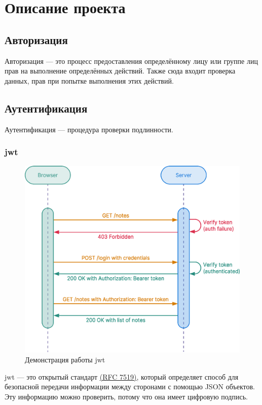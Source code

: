 \section{Описание проекта}
\subsection{Авторизация}
Авторизация --- это процесс предоставления определённому лицу или группе лиц прав на выполнение определённых действий. Также сюда входит проверка данных, прав при попытке выполнения этих действий.

\subsection{Аутентификация}
Аутентификация --- процедура проверки подлинности.

\subsubsection{\acrfull{jwt}}
\begin{figure}[h!]
    \begin{center}
        \includegraphics[scale=0.4]{images/jwt-example.eps}
        \caption{Демонстрация работы \acrshort{jwt}}
    \end{center}
\end{figure}

\acrfull{jwt} --- это открытый стандарт \href{https://tools.ietf.org/html/rfc7519}{(RFC 7519)}, который определяет способ для безопасной передачи информации между сторонами с помощью JSON объектов. Эту информацию можно проверить, потому что она имеет цифровую подпись.

\clearpage